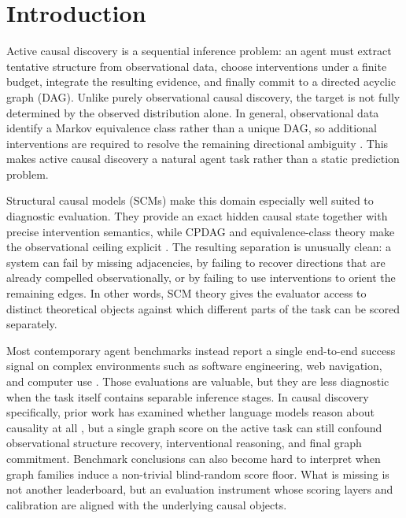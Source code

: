 \section{Introduction}
\label{sec:introduction}

Active causal discovery is a sequential inference problem: an agent must extract tentative structure from observational data, choose interventions under a finite budget, integrate the resulting evidence, and finally commit to a directed acyclic graph (DAG). Unlike purely observational causal discovery, the target is not fully determined by the observed distribution alone. In general, observational data identify a Markov equivalence class rather than a unique DAG, so additional interventions are required to resolve the remaining directional ambiguity \citep{spirtes2000causation,verma1990equivalence,andersson1997characterization,eberhardt2005interventions}. This makes active causal discovery a natural agent task rather than a static prediction problem.

Structural causal models (SCMs) make this domain especially well suited to diagnostic evaluation. They provide an exact hidden causal state together with precise intervention semantics, while CPDAG and equivalence-class theory make the observational ceiling explicit \citep{spirtes2000causation,andersson1997characterization,hauser2012gies}. The resulting separation is unusually clean: a system can fail by missing adjacencies, by failing to recover directions that are already compelled observationally, or by failing to use interventions to orient the remaining edges. In other words, SCM theory gives the evaluator access to distinct theoretical objects against which different parts of the task can be scored separately.

Most contemporary agent benchmarks instead report a single end-to-end success signal on complex environments such as software engineering, web navigation, and computer use \citep{jimenez2024swebench,liu2024agentbench,zhou2024webarena,xie2024osworld,mialon2023gaia}. Those evaluations are valuable, but they are less diagnostic when the task itself contains separable inference stages. In causal discovery specifically, prior work has examined whether language models reason about causality at all \citep{kiciman2023llmcausal,zecevic2023causalparrots}, but a single graph score on the active task can still confound observational structure recovery, interventional reasoning, and final graph commitment. Benchmark conclusions can also become hard to interpret when graph families induce a non-trivial blind-random score floor. What is missing is not another leaderboard, but an evaluation instrument whose scoring layers and calibration are aligned with the underlying causal objects.

